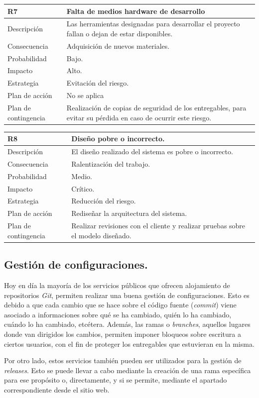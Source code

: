 \documentclass[twoside]{report}
\newcommand\addrow[2]{#1 &#2\\ }
\newcommand\addheading[2]{#1 &#2\\ \hline}
\newcommand\tabularhead{\begin{tabular}{lp{0.7\textwidth}}
\hline
}
\newenvironment{risk}{\tabularhead}
{\hline\end{tabular}}
\begin{document}
\vspace{0.5cm}

\begin{risk}
  \addheading{R7}{Falta de medios hardware de desarrollo}
  \addrow{Descripción}{Las herramientas designadas para desarrollar el proyecto fallan o dejan de estar disponibles.}
  \addrow{Consecuencia}{Adquisición de nuevos materiales.}
  \addrow{Probabilidad}{Bajo.}
  \addrow{Impacto}{Alto. }
  \addrow{Estrategia}{Evitación del riesgo.}
  \addrow{Plan de acción}{No se aplica}
  \addrow{Plan de contingencia}{Realización de copias de seguridad de los entregables, para evitar su pérdida en caso de ocurrir este riesgo.}
\end{risk}

\vspace{0.5cm}

\begin{risk}
  \addheading{R8}{Diseño pobre o incorrecto.} 
  \addrow{Descripción}{El diseño realizado del sistema es pobre o incorrecto.}
  \addrow{Consecuencia}{Ralentización del trabajo.}
  \addrow{Probabilidad}{Medio.}
  \addrow{Impacto}{Crítico. }
  \addrow{Estrategia}{Reducción del riesgo.}
  \addrow{Plan de acción}{Rediseñar la arquitectura del sistema.}
  \addrow{Plan de contingencia}{Realizar revisiones con el cliente y realizar pruebas sobre el modelo diseñado.}
\end{risk}

\subsection{Gestión de configuraciones.}

Hoy en día la mayoría de los servicios públicos que ofrecen alojamiento de repositorios \textit{Git}, permiten realizar una buena gestión de configuraciones. Esto es debido a que cada cambio que se hace sobre el código fuente (\textit{commit}) viene asociado a informaciones sobre qué se ha cambiado, quién lo ha cambiado, cuándo lo ha cambiado, etcétera. Además, las ramas o \textit{branches}, aquellos lugares donde van dirigidos los cambios, permiten imponer bloqueos sobre escritura a ciertos usuarios, con el fin de proteger los entregables que estuvieran en la misma.

Por otro lado, estos servicios también pueden ser utilizados para la gestión de \textit{releases}. Esto se puede llevar a cabo mediante la creación de una rama específica para ese propósito o, directamente, y si se permite, mediante el apartado correspondiente desde el sitio web.
\end{document}

